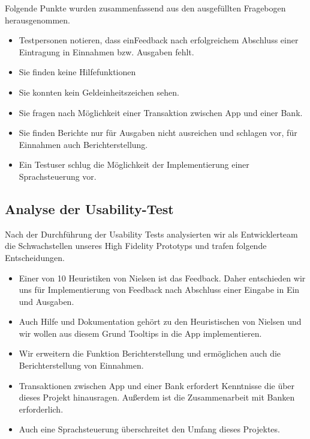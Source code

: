 \documentclass[runningheads,a4paper]{llncs}
\begin{document}
Folgende Punkte wurden zusammenfassend aus den ausgefüllten Fragebogen herausgenommen.\\

\begin {itemize}
\item Testpersonen notieren, dass einFeedback nach erfolgreichem Abschluss einer Eintragung in Einnahmen bzw. Ausgaben fehlt.\\
\item Sie finden keine Hilfefunktionen\\
\item Sie konnten kein Geldeinheitszeichen sehen.\\
\item Sie fragen nach Möglichkeit einer Transaktion zwischen App und einer Bank.\\
\item Sie finden Berichte nur für Ausgaben nicht ausreichen und schlagen vor, für Einnahmen auch Berichterstellung.\\
\item Ein Testuser schlug die Möglichkeit der Implementierung einer Sprachsteuerung vor.\\
\end {itemize}



\subsection{Analyse der Usability-Test}

Nach der Durchführung der Usability Tests analysierten wir als Entwicklerteam die Schwachstellen unseres High Fidelity Prototyps und trafen folgende Entscheidungen.\\

\begin {itemize}
\item Einer von 10 Heuristiken von Nielsen ist das Feedback. Daher entschieden wir uns für Implementierung von Feedback nach Abschluss einer Eingabe in Ein und Ausgaben.\\
\item Auch Hilfe und Dokumentation gehört zu den Heuristischen von Nielsen und wir wollen aus diesem Grund Tooltips in die App implementieren.\\
\item Wir erweitern die Funktion Berichterstellung und ermöglichen auch die Berichterstellung von Einnahmen.\\
\item Transaktionen zwischen App und einer Bank erfordert Kenntnisse die über dieses Projekt hinausragen. Außerdem ist die Zusammenarbeit mit Banken erforderlich.\\
\item Auch eine Sprachsteuerung überschreitet den Umfang dieses Projektes.\\
\end {itemize}
\end{document}
